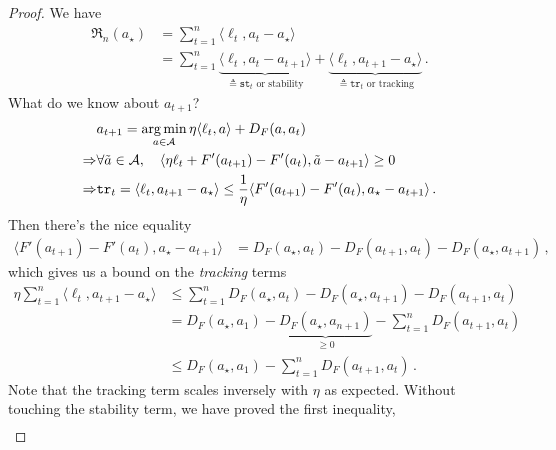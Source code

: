 \documentclass{article}
\theoremstyle{plain}
\theoremstyle{definition}
\newcommand{\argmin}{\operatornamewithlimits{arg\,min}}
\newcommand{\Reg}{\mathfrak{R}}
\newcommand{\cA}{\mathcal A}
\begin{document}
\begin{proof}
    We have
    \begin{align*}
        \Reg_n(a_\star)
         & = \sum_{t=1}^{n} \langle \ell_t, a_t - a_\star \rangle                                                                                                                                                                         \\
         & = \sum_{t=1}^{n} \underbrace{\langle \ell_t, a_t - a_{t+1} \rangle}_{\triangleq \texttt{st}_t \text{ or stability}} + \underbrace{\langle \ell_t, a_{t+1} - a_\star \rangle}_{\triangleq \texttt{tr}_t \text{ or tracking}}\,.
    \end{align*}
    What do we know about $a_{t+1}$?
    \begin{align*}
                    & a_{t+1} = \argmin_{a \in \cA} \eta \langle \ell_t, a \rangle + D_F(a, a_t)                                                                \\
        \Rightarrow &
        \forall \tilde{a} \in \cA, \quad
        \langle \eta \ell_t + F'(a_{t+1}) - F'(a_t), \tilde{a} - a_{t+1} \rangle \geq 0                                                                         \\
        \Rightarrow
                    & \texttt{tr}_t = \langle \ell_t, a_{t+1} - a_\star \rangle \leq \frac{1}{\eta} \langle F'(a_{t+1}) - F'(a_t), a_\star - a_{t+1} \rangle\,.
    \end{align*}
    Then there's the nice equality
    \begin{align*}
        \langle F'(a_{t+1}) - F'(a_t), a_\star - a_{t+1} \rangle
         & =
        D_F(a_\star, a_t) - D_F(a_{t+1}, a_t) - D_F(a_\star, a_{t+1})\,,
    \end{align*}
    which gives us a bound on the \textit{tracking} terms
    \begin{align*}
        \eta \sum_{t=1}^{n} \langle \ell_t, a_{t+1} - a_\star \rangle
         & \leq \sum_{t=1}^{n} D_F(a_\star, a_t)  - D_F(a_\star, a_{t+1}) - D_F(a_{t+1}, a_t)                   \\
         & = D_F(a_\star, a_1) - \underbrace{D_F(a_\star, a_{n+1})}_{\geq 0} - \sum_{t=1}^{n} D_F(a_{t+1}, a_t) \\
         & \leq D_F(a_\star, a_1) - \sum_{t=1}^{n} D_F(a_{t+1}, a_t)\,.
    \end{align*}
    Note that the tracking term scales inversely with $\eta$ as expected.
    Without touching the stability term, we have proved the first inequality,
    \begin{align*}

\end{align*}
\end{proof}
\end{document}
